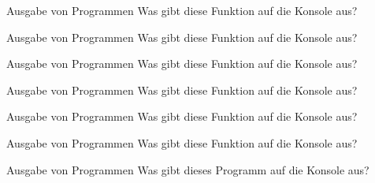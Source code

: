 \begin{task}{Ausgabe von Programmen}
    Was gibt diese Funktion auf die Konsole aus?
\end{task}

\begin{task}{Ausgabe von Programmen}
    Was gibt diese Funktion auf die Konsole aus?
\end{task}

\begin{task}{Ausgabe von Programmen}
    Was gibt diese Funktion auf die Konsole aus?
\end{task}

\begin{task}{Ausgabe von Programmen}
    Was gibt diese Funktion auf die Konsole aus?
\end{task}

\begin{task}{Ausgabe von Programmen}
    Was gibt diese Funktion auf die Konsole aus?
\end{task}

\begin{task}{Ausgabe von Programmen}
    Was gibt diese Funktion auf die Konsole aus?
\end{task}

\begin{task}{Ausgabe von Programmen}
    Was gibt dieses Programm auf die Konsole aus?
\end{task}
